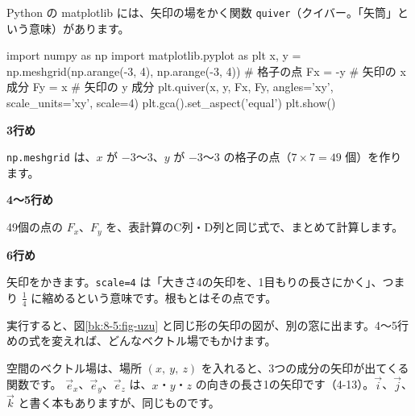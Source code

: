 Python の matplotlib には、矢印の場をかく関数 \texttt{quiver}（クイバー。「矢筒」という意味）があります。
\begin{bkcode}[Python]
import numpy as np
import matplotlib.pyplot as plt
x, y = np.meshgrid(np.arange(-3, 4), np.arange(-3, 4))  \# 格子の点
Fx = -y    \# 矢印の x 成分
Fy = x     \# 矢印の y 成分
plt.quiver(x, y, Fx, Fy, angles='xy', scale\_units='xy', scale=4)
plt.gca().set\_aspect('equal')
plt.show()
\end{bkcode}
\begin{enumerate}[label={\bkcircled[\bkTT]{\arabic*}}, leftmargin=2.4\zw, itemsep=2pt, topsep=2pt]
\item \textbf{3行め}\par\nobreak\noindent \texttt{np.meshgrid} は、$x$ が $-3$〜3、$y$ が $-3$〜3 の格子の点（$7\times7=49$ 個）を作ります。
\item \textbf{4〜5行め}\par\nobreak\noindent 49個の点の $F_x$、$F_y$ を、表計算のC列・D列と同じ式で、まとめて計算します。
\item \textbf{6行め}\par\nobreak\noindent 矢印をかきます。\texttt{scale=4} は「大きさ4の矢印を、1目もりの長さにかく」、つまり $\frac14$ に縮めるという意味です。根もとはその点です。
\end{enumerate}
実行すると、図\ref{bk:8-5:fig-uzu} と同じ形の矢印の図が、別の窓に出ます。4〜5行めの式を変えれば、どんなベクトル場でもかけます。


\leavevmode\label{bk:8-5:3d}空間のベクトル場は、場所 $(x,\ y,\ z)$ を入れると、3つの成分の矢印が出てくる関数です。
$\vec e_x$、$\vec e_y$、$\vec e_z$ は、$x$・$y$・$z$ の向きの長さ1の矢印です（4-13）。$\vec i$、$\vec j$、$\vec k$ と書く本もありますが、同じものです。

